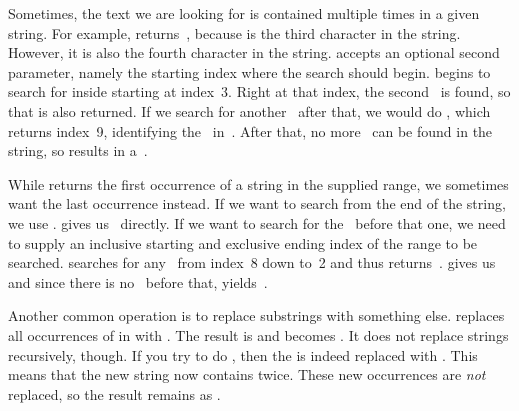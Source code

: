 Sometimes, the text we are looking for is contained multiple times in a given string.
For example,  returns~, because  is the third character in the string.
However, it is also the fourth character in the string.
 accepts an optional second parameter, namely the starting index where the search should begin.
 begins to search for  inside  starting at index~3.
Right at that index, the second~ is found, so that  is also returned.
If we search for another~ after that, we would do , which returns index~9, identifying the~ in~.
After that, no more~ can be found in the string, so  results in a~.%
%
\begin{sloppypar}%
While  returns the first occurrence of a string in the supplied range, we sometimes want the last occurrence instead.
If we want to search from the end of the string, we use .
 gives us~ directly.
If we want to search for the~ before that one, we need to supply an inclusive starting and exclusive ending index of the range to be searched.
 searches for any~ from index~8 down to~2 and thus returns~.
 gives us~ and since there is no~ before that,  yields~.
\end{sloppypar}%
%
\begin{sloppypar}%
Another common operation is to replace substrings with something else.
 replaces all occurrences of  in  with .
The result is  and  becomes .
It does not replace strings recursively, though.
If you try to do , then the  is indeed replaced with .
This means that the new string now contains  twice.
These new occurrences are \emph{not} replaced, so the result remains as .%
\end{sloppypar}%
